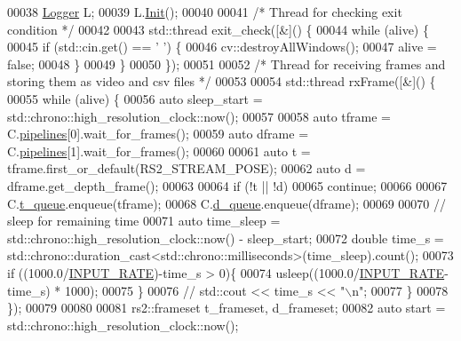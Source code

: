 \begin{DoxyCode}
00038     \hyperlink{classLogger}{Logger} L;
00039     L.\hyperlink{classLogger_a42c282f4c0e2c6557d16e2967c1ddf7e}{Init}();
00040 
00041     \textcolor{comment}{/* Thread for checking exit condition */}
00042 
00043     std::thread exit\_check([&]() \{
00044         \textcolor{keywordflow}{while} (alive) \{
00045             \textcolor{keywordflow}{if} (std::cin.\textcolor{keyword}{get}() == \textcolor{charliteral}{' '}) \{
00046                 cv::destroyAllWindows();
00047                 alive = \textcolor{keyword}{false};
00048             \}
00049         \}
00050     \});
00051 
00052     \textcolor{comment}{/* Thread for receiving frames and storing them as video and csv files */} 
00053 
00054     std::thread rxFrame([&]() \{
00055         \textcolor{keywordflow}{while} (alive) \{
00056             \textcolor{keyword}{auto} sleep\_start = std::chrono::high\_resolution\_clock::now();
00057 
00058             \textcolor{keyword}{auto} tframe = C.\hyperlink{classCamera_a689d4141375d8f7fbf1651338c1ea9c0}{pipelines}[0].wait\_for\_frames();
00059             \textcolor{keyword}{auto} dframe = C.\hyperlink{classCamera_a689d4141375d8f7fbf1651338c1ea9c0}{pipelines}[1].wait\_for\_frames();
00060 
00061             \textcolor{keyword}{auto} t = tframe.first\_or\_default(RS2\_STREAM\_POSE);
00062             \textcolor{keyword}{auto} d = dframe.get\_depth\_frame();
00063 
00064             \textcolor{keywordflow}{if} (!t || !d)
00065                 \textcolor{keywordflow}{continue};
00066 
00067             C.\hyperlink{classCamera_ad8a4c52c0ae125ab8ca66902408f5e95}{t\_queue}.enqueue(tframe);
00068             C.\hyperlink{classCamera_a84a3a043e61b967fb1dc6fbe62bf33aa}{d\_queue}.enqueue(dframe);
00069 
00070             \textcolor{comment}{// sleep for remaining time}
00071             \textcolor{keyword}{auto} time\_sleep = std::chrono::high\_resolution\_clock::now() - sleep\_start;
00072             \textcolor{keywordtype}{double} time\_s = std::chrono::duration\_cast<std::chrono::milliseconds>(time\_sleep).count();
00073             \textcolor{keywordflow}{if} ((1000.0/\hyperlink{Camera_8hpp_a4a8be390afbe56038ccc6fe44e61aa00}{INPUT\_RATE})-time\_s > 0)\{
00074                 usleep((1000.0/\hyperlink{Camera_8hpp_a4a8be390afbe56038ccc6fe44e61aa00}{INPUT\_RATE}-time\_s) * 1000);
00075             \}
00076             \textcolor{comment}{// std::cout << time\_s << "\(\backslash\)n";}
00077         \}
00078     \});
00079 
00080 
00081     rs2::frameset t\_frameset, d\_frameset;
00082     \textcolor{keyword}{auto} start = std::chrono::high\_resolution\_clock::now();

\end{DoxyCode}
